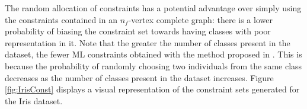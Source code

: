 The random allocation of constraints has a potential advantage over simply using the constraints contained in an $n_f$-vertex complete graph: there is a lower probability of biasing the constraint set towards having classes with poor representation in it. Note that the greater the number of classes present in the dataset, the fewer ML constraints obtained with the method proposed in \cite{wagstaff2001constrained}. This is because the probability of randomly choosing two individuals from the same class decreases as the number of classes present in the dataset increases. Figure \ref{fig:IrisConst} displays a visual representation of the constraint sets generated for the Iris dataset.

\begin{figure}[bth]
	\myfloatalign
	 \quad
	 \quad

\end{figure}

